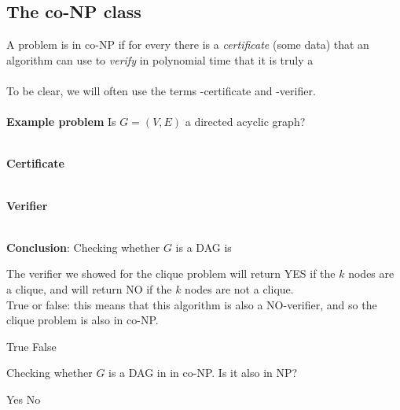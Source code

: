 \documentclass[11  pt]{article}
\begin{document}
	\subsection{The co-NP class}
A problem is in co-NP if for every  there is a \emph{certificate} (some data) that an algorithm can use to \emph{verify} in polynomial time that it is truly a  \\ \\

To be clear, we will often use the terms -certificate and -verifier. \\ \\


\textbf{Example problem} Is $G = (V,E)$ a directed acyclic graph? \\ \\

\vs{2cm}

\textbf{Certificate} \\ \\ %

\vs{2cm}

\textbf{Verifier} \\ \\ %


\vfill

\textbf{Conclusion}: Checking whether $G$ is a DAG is   \\
\vs{1cm}

\newpage

\begin{Qu}
	The verifier we showed for the clique problem will return YES if the $k$ nodes are a clique, and will return NO if the $k$ nodes are not a clique. \\
	
	True or false: this means that this algorithm is also a NO-verifier, and so the clique problem is also in co-NP.
	\begin{itemize}
		\aitem True
		\bitem False
	\end{itemize}
	
	
\end{Qu}

\vfill

\begin{Qu}
	Checking whether $G$ is a DAG in in co-NP. Is it also in NP? 
	\begin{itemize}
		\aitem Yes
		\bitem No
	\end{itemize}
	
\end{Qu}
\vfill
\newpage
\end{document}
